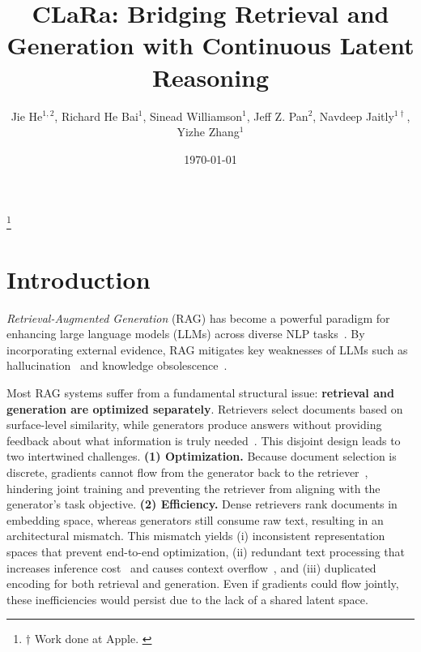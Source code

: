 \documentclass{applemlr}
\title{CLaRa: Bridging Retrieval and Generation with Continuous Latent Reasoning}
\author{
  Jie He$^{1,2}$,
  Richard He Bai$^{1}$,
  Sinead Williamson$^{1}$,
  Jeff Z. Pan$^{2}$,
  Navdeep Jaitly$^{1\dagger}$,
  Yizhe Zhang$^{1}$
}
\affiliation{
  $^{1}$Apple \quad
  $^{2}$University of Edinburgh
}
\date{\sffamily\today}
\makeatletter
\numberwithin{equation}{section}
\newcommand\applefootnote[1]{%
  \begingroup
  \renewcommand\thefootnote{}%
  \renewcommand\@makefntext[1]{\noindent##1}%
  \footnote{#1}%
  \addtocounter{footnote}{-1}%
  \endgroup
}
\makeatother
\begin{document}
\maketitle

\applefootnote{ \textcolor{textgray}{\sffamily $\dagger$ Work done at Apple. }}

\section{Introduction}
\textit{Retrieval-Augmented Generation} (RAG) has become a powerful paradigm for enhancing large language models (LLMs) across diverse NLP tasks~\citep{10.5555/3495724.3496517,gao2024retrievalaugmentedgenerationlargelanguage,li-etal-2024-retrieval,DBLP:journals/corr/abs-2407-13193,abootorabi-etal-2025-ask}.
By incorporating external evidence, RAG mitigates key weaknesses of LLMs such as hallucination~\citep{ayala-bechard-2024-reducing} and knowledge obsolescence~\citep{lau2025readingtimelinesraganswering}.

Most RAG systems suffer from a fundamental structural issue: \textbf{retrieval and generation are optimized separately}. Retrievers select documents based on surface-level similarity, while generators produce answers without providing feedback about what information is truly needed~\citep{shi2025directretrievalaugmentedoptimizationsynergizing}. This disjoint design leads to two intertwined challenges.
\textbf{(1) Optimization.} Because document selection is discrete, gradients cannot flow from the generator back to the retriever~\citep{sachan2021endtoend,lin2024radit}, hindering joint training and preventing the retriever from aligning with the generator’s task objective.
\textbf{(2) Efficiency.} Dense retrievers rank documents in embedding space, whereas generators still consume raw text, resulting in an architectural mismatch. This mismatch yields (i) inconsistent representation spaces that prevent end-to-end optimization, (ii) redundant text processing that increases inference cost~\citep{10.5555/3692070.3693515} and causes context overflow~\citep{leng2024longcontextragperformance,yue2025inference}, and (iii) duplicated encoding for both retrieval and generation. Even if gradients could flow jointly, these inefficiencies would persist due to the lack of a shared latent space.
\end{document}
